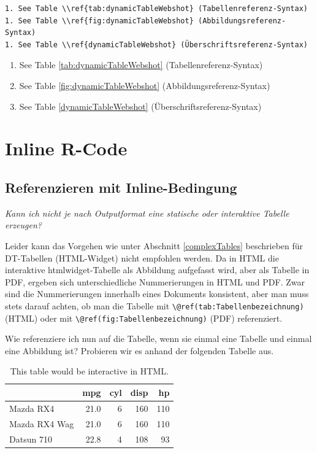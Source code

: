 \documentclass[]{book}
\providecommand{\tightlist}{%
  \setlength{\itemsep}{0pt}\setlength{\parskip}{0pt}}
\theoremstyle{definition}
\theoremstyle{definition}
\theoremstyle{remark}
\begin{document}
\begin{verbatim}
1. See Table \\ref{tab:dynamicTableWebshot} (Tabellenreferenz-Syntax)
1. See Table \\ref{fig:dynamicTableWebshot} (Abbildungsreferenz-Syntax)
1. See Table \\ref{dynamicTableWebshot} (Überschriftsreferenz-Syntax)
\end{verbatim}

\begin{enumerate}
\def\labelenumi{\arabic{enumi}.}
\tightlist
\item
  See Table \ref{tab:dynamicTableWebshot} (Tabellenreferenz-Syntax)
\item
  See Table \ref{fig:dynamicTableWebshot} (Abbildungsreferenz-Syntax)
\item
  See Table \ref{dynamicTableWebshot} (Überschriftsreferenz-Syntax)
\end{enumerate}

\section{Inline R-Code}\label{inline-r-code}

\subsection{Referenzieren mit
Inline-Bedingung}\label{referenzieren-mit-inline-bedingung}

\emph{Kann ich nicht je nach Outputformat eine statische oder
interaktive Tabelle erzeugen?}

Leider kann das Vorgehen wie unter Abschnitt \ref{complexTables}
beschrieben für DT-Tabellen (HTML-Widget) nicht empfohlen werden. Da in
HTML die interaktive htmlwidget-Tabelle als Abbildung aufgefasst wird,
aber als Tabelle in PDF, ergeben sich unterschiedliche Nummerierungen in
HTML und PDF. Zwar sind die Nummerierungen innerhalb eines Dokuments
konsistent, aber man muss stets darauf achten, ob man die Tabelle mit
\texttt{\textbackslash{}@ref(tab:Tabellenbezeichnung)} (HTML) oder mit
\texttt{\textbackslash{}@ref(fig:Tabellenbezeichnung)} (PDF)
referenziert.

Wie referenziere ich nun auf die Tabelle, wenn sie einmal eine Tabelle
und einmal eine Abbildung ist? Probieren wir es anhand der folgenden
Tabelle aus.

\begin{table}

\caption{\label{tab:htmlWidgetTableCondition}This table would be interactive in HTML.}
\centering
\begin{tabular}[t]{lrrrr}
\toprule
  & mpg & cyl & disp & hp\\
\midrule
Mazda RX4 & 21.0 & 6 & 160 & 110\\
Mazda RX4 Wag & 21.0 & 6 & 160 & 110\\
Datsun 710 & 22.8 & 4 & 108 & 93\\
\bottomrule
\end{tabular}
\end{table}
\end{document}
